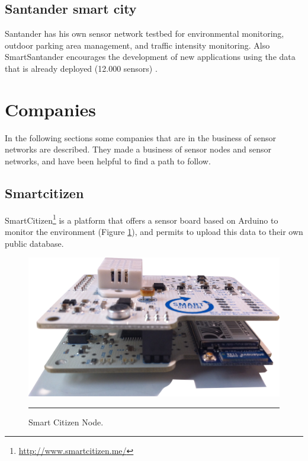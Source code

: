 \documentclass[12pt, a4paper,twoside]{tesi_upf}
\begin{document}
    \subsection{Santander smart city}
      Santander has his own sensor network testbed for environmental monitoring, outdoor parking area management, and traffic intensity monitoring. Also SmartSantander encourages the development of new applications using the data that is already deployed (12.000 sensors) \cite{SmartcitySantander}.
    
  \section{Companies}
    In the following sections some companies that are in the business of sensor networks are described. They made a business of sensor nodes and sensor networks, and have been helpful to find a path to follow.
    
    \subsection{Smartcitizen}
      SmartCitizen\footnote{\url{http://www.smartcitizen.me/}} is a platform that offers a sensor board based on Arduino to monitor the environment (Figure \ref{fig:SmartCitizenNode}), and permits to upload this data to their own public database.
      
      \begin{figure}[htbp]
        \centering
            \includegraphics[scale=0.08]{./Figures/smartcitizen.png}
            \rule{18em}{0.5pt}
        \caption[Smart Citizen Node]{Smart Citizen Node.}
        \label{fig:SmartCitizenNode}
    \end{figure}
            
\end{document}
